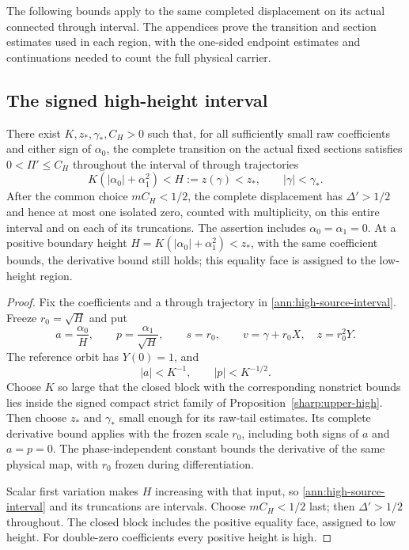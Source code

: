 The following bounds apply to the same completed displacement on its
actual connected through interval. The appendices prove the transition
and section estimates used in each region, with the one-sided endpoint
estimates and continuations needed to count the full physical carrier.

\subsection{The signed high-height interval}

\begin{corollary}
\label{rew:cor-high-derivative-signed}
There exist \(K,z_*,\gamma_*,C_H>0\) such that, for all sufficiently
small raw coefficients and either sign of \(\alpha_0\), the complete
transition on the actual fixed sections satisfies \(0<\Pi'\le C_H\)
throughout the interval of through trajectories
\begin{equation}\label{ann:high-source-interval}
 K(|\alpha_0|+\alpha_1^2)<H:=z(\gamma)<z_*,
 \qquad |\gamma|<\gamma_*.
\end{equation}
After the common choice \(mC_H<1/2\), the complete displacement has
\(\Delta'>1/2\) and hence at most one isolated zero, counted with
multiplicity, on this entire interval and on each of its truncations.
The assertion includes \(\alpha_0=\alpha_1=0\). At a positive
boundary height \(H=K(|\alpha_0|+\alpha_1^2)<z_*\), with the same
coefficient bounds, the derivative bound still holds; this equality
face is assigned to the low-height region.
\end{corollary}
\begin{proof}
Fix the coefficients and a through trajectory in
\eqref{ann:high-source-interval}. Freeze \(r_0=\sqrt H\) and put
\[
 a=\frac{\alpha_0}{H},\qquad
 p=\frac{\alpha_1}{\sqrt H},\qquad s=r_0,
 \qquad v=\gamma+r_0X,\quad z=r_0^2Y.
\]
The reference orbit has \(Y(0)=1\), and
\[
 |a|<K^{-1},\qquad |p|<K^{-1/2}.
\]
Choose \(K\) so large that the closed block with the corresponding
nonstrict bounds lies inside the signed compact strict family of
Proposition~\ref{sharp:upper-high}. Then choose \(z_*\) and
\(\gamma_*\) small enough for its raw-tail estimates. Its complete
derivative bound applies with the frozen scale \(r_0\), including
both signs of \(a\) and \(a=p=0\). The phase-independent constant bounds the derivative of the same
physical map, with \(r_0\) frozen during differentiation.

Scalar first variation makes \(H\) increasing with that input, so
\eqref{ann:high-source-interval} and its truncations are intervals.
Choose \(mC_H<1/2\) last; then \(\Delta'>1/2\) throughout.
The closed block includes the positive equality face, assigned to
low height. For double-zero coefficients every positive height is high.
\end{proof}

